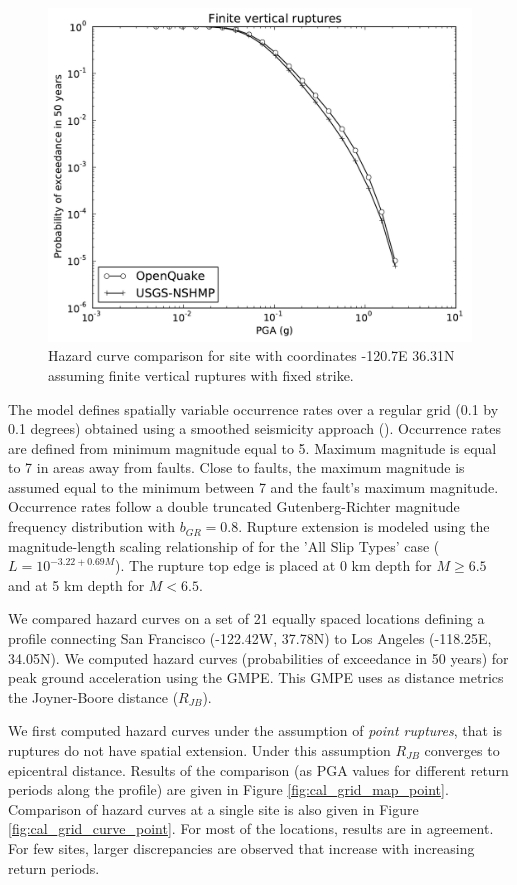 \begin{figure}[!h]
\centering
\includegraphics[width=12.5cm]{./qareport/pictures/-120pt7_36pt31_fixedstrikevertical.pdf}
\caption{Hazard curve comparison for site with coordinates -120.7E 36.31N assuming finite vertical ruptures with fixed strike.}
\label{fig:cal_grid_curve_finite}
\end{figure}

The model defines spatially variable occurrence rates over a regular grid (0.1
by 0.1 degrees) obtained using a smoothed seismicity approach
(\cite{frankel1995}). Occurrence rates are defined from minimum magnitude equal
to 5. Maximum magnitude is equal to 7 in areas away from faults. Close to
faults, the maximum magnitude is assumed equal to the minimum between 7 and the
fault's maximum magnitude. Occurrence rates follow a double truncated
Gutenberg-Richter magnitude frequency distribution with $b_{GR} = 0.8$. Rupture
extension is modeled using the magnitude-length scaling relationship of
\citet{wells1994} for the 'All Slip Types' case ($L=10^{-3.22+0.69 M}$). The
rupture top edge is placed at 0 km depth for $M \ge 6.5$ and at 5 km depth for
$M < 6.5$.

We compared hazard curves on a set of 21 equally spaced locations defining a
profile connecting San Francisco (-122.42W, 37.78N) to Los Angeles (-118.25E,
34.05N). We computed hazard curves (probabilities of exceedance in 50 years) for
peak ground acceleration using the \citet{boore2008} GMPE. This GMPE uses as
distance metrics the Joyner-Boore distance ($R_{JB}$). 

We first computed hazard curves under the assumption of \textit{point ruptures},
that is ruptures do not have spatial extension. Under this assumption $R_{JB}$
converges to epicentral distance. Results of the comparison (as PGA values for
different return periods along the profile) are given in Figure
\ref{fig:cal_grid_map_point}. Comparison of hazard curves at a single site is
also given in Figure \ref{fig:cal_grid_curve_point}. For most of the locations,
results are in agreement. For few sites, larger discrepancies are observed that
increase with increasing return periods.

